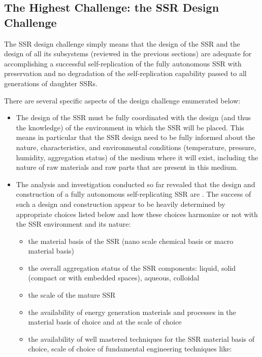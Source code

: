 \subsection[The Highest Challenge: the SSR Design Challenge]{The Highest
Challenge: the SSR Design Challenge}

The SSR design challenge simply
means that the design of the SSR and the design of all its subsystems
(reviewed in the previous sections) are adequate for accomplishing a
successful self-replication of the fully autonomous SSR with
preservation and no degradation of the self-replication capability
passed to all generations of daughter SSRs.

There are several specific aspects of the design challenge enumerated
below:

\begin{itemize}
\item The design of the SSR must be fully coordinated with the design
(and thus the knowledge) of the environment in which the SSR will be
placed. This means in particular that the SSR design need to be fully
informed about the nature, characteristics, and environmental conditions
(temperature, pressure, humidity, aggregation status) of the medium
where it will exist, including the nature of raw materials and raw
parts that are present in this medium.
\item The analysis and investigation conducted so far revealed that the
design and construction of a fully autonomous self-replicating SSR are
. The success of such a design and
construction appear to be heavily determined by appropriate choices
listed below and how these choices harmonize or not with the SSR
environment and its nature:

\begin{itemize}
\item the material basis of the SSR (nano scale chemical basis or macro material basis)
\item the overall aggregation status of the SSR components: liquid,
solid (compact or with embedded spaces), aqueous, colloidal
\item the scale of the mature SSR 
\item the availability of energy generation materials and processes in
the material basis of choice and at the scale of choice
\item the availability of well mastered techniques for the SSR material
basis of choice, scale of choice of fundamental engineering techniques
like:


\end{itemize}
\end{itemize}
